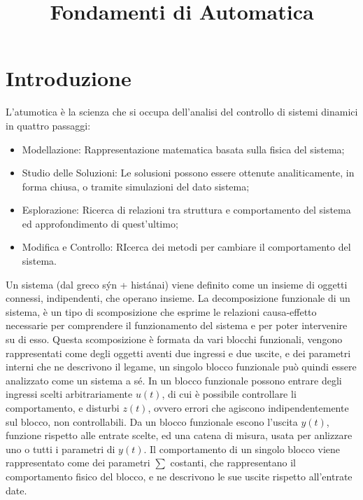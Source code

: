 \documentclass{article}
\title{Fondamenti di Automatica}
\author{}
\date{}
\numberwithin{equation}{subsection}
\begin{document}
\maketitle

\clearpage

\tableofcontents

\clearpage

\section{Introduzione}

L'atumotica è la scienza che si occupa dell'analisi del controllo di sistemi dinamici in quattro passaggi:
\begin{itemize}
    \item Modellazione: Rappresentazione matematica basata sulla fisica del sistema;
    \item Studio delle Soluzioni: Le solusioni possono essere ottenute analiticamente, in forma chiusa, o tramite simulazioni del dato sistema;
    \item Esplorazione: Ricerca di relazioni tra struttura e comportamento del sistema ed approfondimento di quest'ultimo;
    \item Modifica e Controllo: RIcerca dei metodi per cambiare il comportamento del sistema.
\end{itemize}
Un sistema (dal greco s\'{y}n + hist\'{a}nai) viene definito come un insieme di oggetti connessi, indipendenti, che operano insieme.
La decomposizione funzionale di un sistema, è un tipo di scomposizione che esprime le relazioni causa-effetto necessarie per comprendere il 
funzionamento del sistema e per poter intervenire su di esso. 
Questa scomposizione è formata da vari blocchi funzionali, vengono rappresentati come degli oggetti aventi due ingressi e due uscite, e dei parametri 
interni che ne descrivono il legame, un singolo blocco funzionale può quindi essere analizzato come un sistema a sé. In un blocco funzionale possono 
entrare degli ingressi scelti arbitrariamente $u(t)$, di cui è possibile 
controllare li comportamento, e disturbi $z(t)$, ovvero errori che agiscono indipendentemente sul blocco, non controllabili. Da un blocco funzionale 
escono l'uscita $y(t)$, funzione rispetto alle entrate scelte, ed una catena di misura, usata per anlizzare uno o tutti i parametri di $y(t)$. 
Il comportamento di un singolo blocco viene rappresentato come dei parametri $\sum$ costanti, che rappresentano il comportamento fisico del blocco, 
e ne descrivono le sue uscite rispetto all'entrate date. 
\end{document}
